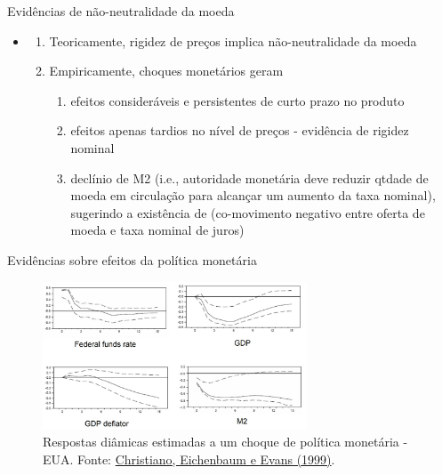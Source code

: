 \documentclass[10pt]{beamer}
\begin{document}
\begin{frame}
    {Evidências de não-neutralidade da moeda}
    \begin{itemize}
        \item {}\bigskip
        \begin{enumerate}
            \item Teoricamente, rigidez de preços implica não-neutralidade da moeda\bigskip
            \item Empiricamente, choques monetários geram\medskip
            \begin{enumerate}
                \item efeitos consideráveis e persistentes de curto prazo no produto\medskip
                \item efeitos apenas tardios no nível de preços - evidência de rigidez nominal\medskip
                \item declínio de M2 (i.e., autoridade monetária deve reduzir qtdade de moeda em circulação para alcançar um aumento da taxa nominal), sugerindo a existência de  (co-movimento negativo entre oferta de moeda e taxa nominal de juros)
            \end{enumerate}
        \end{enumerate}
    \end{itemize}
\end{frame}

\begin{frame}
    {Evidências sobre efeitos da política monetária}
    \begin{figure}
        \centering
        \includegraphics[width=0.7\textwidth]{./figures/aula3_fig5.jpg}
        \caption{Respostas diâmicas estimadas a um choque de política monetária - EUA. Fonte: \href{https://doi.org/10.1016/S1574-0048(99)01005-8}{Christiano, Eichenbaum e Evans (1999)}.}
        \label{aula3_fig5}
    \end{figure}
\end{frame}
\end{document}
